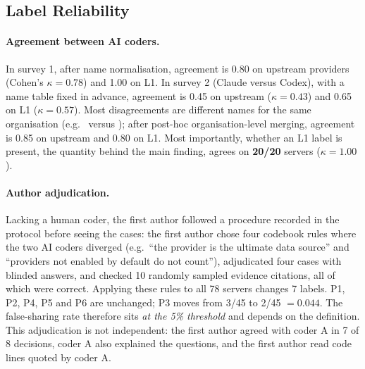 \subsection{Label Reliability}

\paragraph{Agreement between AI coders.} In survey 1, after name normalisation, agreement is 0.80 on upstream providers (Cohen's $\kappa=0.78$) and 1.00 on L1. In survey 2 (Claude versus Codex), with a name table fixed in advance, agreement is 0.45 on upstream ($\kappa=0.43$) and 0.65 on L1 ($\kappa=0.57$). Most disagreements are different names for the same organisation (e.g.\  versus ); after post-hoc organisation-level merging, agreement is 0.85 on upstream and 0.80 on L1. Most importantly, whether an L1 label is present, the quantity behind the main finding, agrees on \textbf{20/20} servers ($\kappa=1.00$).

\paragraph{Author adjudication.} Lacking a human coder, the first author followed a procedure recorded in the protocol before seeing the cases: the first author chose four codebook rules where the two AI coders diverged (e.g.\ ``the provider is the ultimate data source'' and ``providers not enabled by default do not count''), adjudicated four cases with blinded answers, and checked 10 randomly sampled  evidence citations, all of which were correct. Applying these rules to all 78 servers changes 7 labels. P1, P2, P4, P5 and P6 are unchanged; P3 moves from 3/45 to 2/45 $=0.044$. The false-sharing rate therefore sits \emph{at the 5\% threshold} and depends on the definition. This adjudication is not independent: the first author agreed with coder A in 7 of 8 decisions, coder A also explained the questions, and the first author read code lines quoted by coder A.
